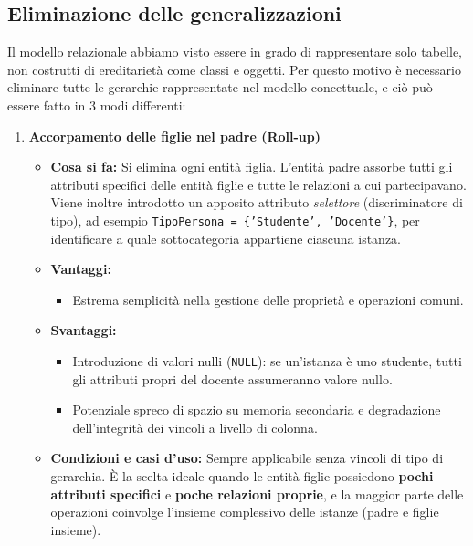 \documentclass[12pt]{report}
\begin{document}
	\subsection{Eliminazione delle generalizzazioni}
	Il modello relazionale abbiamo visto essere in grado di rappresentare solo tabelle, non costrutti di ereditarietà come classi e oggetti. Per questo motivo è necessario eliminare tutte le gerarchie rappresentate nel modello concettuale, e ciò può essere fatto in 3 modi differenti:
	\begin{enumerate}
		\item \textbf{Accorpamento delle figlie nel padre (Roll-up)}
		\begin{itemize}
			\item \textbf{Cosa si fa:} Si elimina ogni entità figlia. L'entità padre assorbe tutti gli attributi specifici delle entità figlie e tutte le relazioni a cui partecipavano. Viene inoltre introdotto un apposito attributo \textit{selettore} (discriminatore di tipo), ad esempio \texttt{TipoPersona = \{'Studente', 'Docente'\}}, per identificare a quale sottocategoria appartiene ciascuna istanza.
			\item \textbf{Vantaggi:}
			\begin{itemize}
				\item Estrema semplicità nella gestione delle proprietà e operazioni comuni.
			\end{itemize}
			\item \textbf{Svantaggi:}
			\begin{itemize}
				\item Introduzione di valori nulli (\texttt{NULL}): se un'istanza è uno studente, tutti gli attributi propri del docente assumeranno valore nullo.
				\item Potenziale spreco di spazio su memoria secondaria e degradazione dell'integrità dei vincoli a livello di colonna.
			\end{itemize}
			\item \textbf{Condizioni e casi d'uso:} 
			Sempre applicabile senza vincoli di tipo di gerarchia. È la scelta ideale quando le entità figlie possiedono \textbf{pochi attributi specifici} e \textbf{poche relazioni proprie}, e la maggior parte delle operazioni coinvolge l'insieme complessivo delle istanze (padre e figlie insieme).
		\end{itemize}
		

\end{enumerate}
\end{document}

